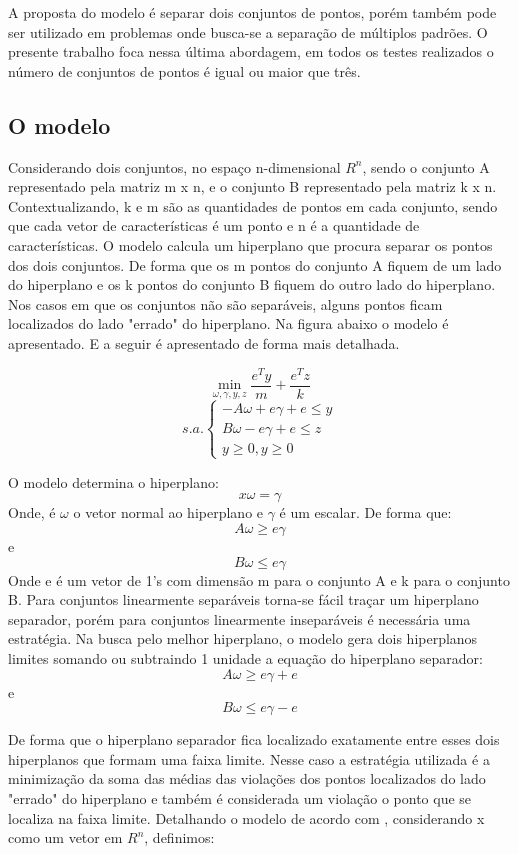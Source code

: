 A proposta do modelo é separar dois conjuntos de pontos, porém também pode ser utilizado em problemas onde busca-se a separação de múltiplos padrões. O presente trabalho foca nessa última abordagem, em todos os testes realizados o número de conjuntos de pontos é igual ou maior que três.

\subsection{O modelo}
Considerando dois conjuntos, no espaço n-dimensional $ R^{n} $, sendo o conjunto A representado pela matriz m x n, e o conjunto B representado pela matriz k x n. Contextualizando, k e m são as quantidades de pontos em cada conjunto, sendo que cada vetor de características é um ponto e n é a quantidade de características. O modelo calcula um hiperplano que procura separar os pontos dos dois conjuntos. De forma que os m pontos do conjunto A fiquem de um lado do hiperplano e os k pontos do conjunto B fiquem do outro lado do hiperplano. Nos casos em que os conjuntos não são separáveis, alguns pontos ficam localizados do lado "errado" do hiperplano. Na figura abaixo o modelo é apresentado. E a seguir é apresentado de forma mais detalhada.

$$\min_{\omega ,\gamma ,y,z}\frac{e^{T}y}{m}+\frac{e^{T}z}{k}$$
$$s.a.\left\{\begin{matrix}-A\omega +e\gamma+e\leq y\\B\omega -e\gamma+e\leq  z\\ y\geq 0,y\geq 0\end{matrix}\right.$$

O modelo determina o hiperplano:
$$ x\omega = \gamma $$
Onde,  é $\omega$ o vetor normal ao hiperplano e $\gamma$ é um escalar. De forma que:
$$A\omega \geq e\gamma$$
e
$$B\omega \leq e\gamma$$
Onde e é um vetor de 1’s com dimensão m para o conjunto A e k para o conjunto B.
Para conjuntos linearmente separáveis torna-se fácil traçar um hiperplano separador, porém para conjuntos linearmente inseparáveis é necessária uma estratégia. Na busca pelo melhor hiperplano, o modelo gera dois hiperplanos limites somando ou subtraindo 1 unidade a equação do hiperplano separador:
$$A\omega \geq e\gamma + e$$
e
$$B\omega \leq e\gamma - e$$

De forma que o hiperplano separador fica localizado exatamente entre esses dois hiperplanos que formam uma faixa limite.
Nesse caso a estratégia utilizada é a minimização da soma das médias das violações dos pontos localizados do lado "errado" do hiperplano e também é considerada um violação o ponto que se localiza na faixa limite.
Detalhando o modelo de acordo com , considerando x como um vetor em $ R^{n} $, definimos:

